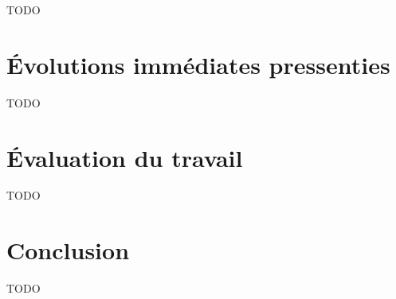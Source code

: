 \documentclass[12pt]{report}
\begin{document}
		TODO

	\chapter{Évolutions immédiates pressenties}
	\label{ch:next-steps}

		TODO

	\chapter{Évaluation du travail}
	\label{ch:auto-critic}

		TODO

	\chapter{Conclusion}
	\label{ch:conclusion}

		TODO

	\printbibliography

\end{document}
